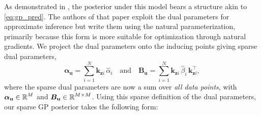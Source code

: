 \documentclass{article}
\newcommand{\mathbold}[1]{\bm{#1}}
\newcommand{\mbf}[1]{\mathbf{#1}}
\newcommand{\T}{\top}
\newcommand{\valpha}[0]{\mathbold{\alpha}}
\newcommand{\MBeta}[0]{\mathbold{B}}
\newcommand{\vu}{\mbf{u}}
\newcommand{\vkzi}{\mbf{k}_{\mbf{z}i}}
\begin{document}
As demonstrated in \citet{adam2021dual}, the posterior under this model bears a structure akin to \cref{eq:gp_pred}. The authors of that paper exploit the dual parameters for approximate inference but write them using the natural parameterization, primarily because this form is more suitable for optimization through natural gradients.
We project the dual parameters onto the inducing points giving sparse dual parameters,
%
\begin{equation} \textstyle
  \valpha_{\vu}  =  \sum_{i=1}^N  \vkzi \, \hat{\alpha}_{i}
  \quad \text{and} \quad
  \MBeta_{\vu} =  \sum_{i=1}^N \vkzi \,\hat{\beta}_{i} \, \vkzi^{\T} ,
\label{eq:dual_sparse}
\end{equation}
%
where the sparse dual parameters are now a sum over \emph{all data points}, with $\valpha_{\vu} \in \R^{M}$ and $\MBeta_{\vu} \in \R^{M  \times M}$. Using this sparse definition of the dual parameters, our sparse GP posterior takes the following form:
\end{document}
